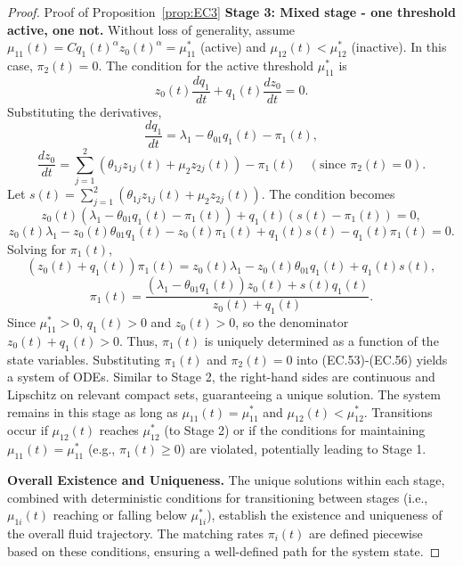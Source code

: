 \begin{proof}{Proof of Proposition~\ref{prop:EC3}}
\textbf{Stage 3: Mixed stage - one threshold active, one not.}
Without loss of generality, assume $\mu_{11}(t) = C q_1(t)^{\alpha} z_0(t)^{\alpha} = \mu_{11}^*$ (active) and $\mu_{12}(t) < \mu_{12}^*$ (inactive).
In this case, $\pi_2(t) = 0$. The condition for the active threshold $\mu_{11}^*$ is
\begin{equation*}
  z_0(t)\frac{dq_1}{dt} + q_1(t)\frac{dz_0}{dt} = 0.
\end{equation*}
Substituting the derivatives,
\begin{equation*}
  \frac{dq_1}{dt} = \lambda_1 - \theta_{01}q_1(t) - \pi_1(t),
\end{equation*}
\begin{equation*}
  \frac{dz_0}{dt} = \sum_{j=1}^{2}(\theta_{1j}z_{1j}(t) + \mu_2z_{2j}(t)) - \pi_1(t) \quad (\text{since } \pi_2(t)=0).
\end{equation*}
Let $s(t) = \sum_{j=1}^{2}(\theta_{1j}z_{1j}(t) + \mu_2z_{2j}(t))$.
The condition becomes
\begin{equation*}
  z_0(t)(\lambda_1 - \theta_{01}q_1(t) - \pi_1(t)) + q_1(t)(s(t) - \pi_1(t)) = 0,
\end{equation*}
\begin{equation*}
  z_0(t)\lambda_1 - z_0(t)\theta_{01}q_1(t) - z_0(t)\pi_1(t) + q_1(t)s(t) - q_1(t)\pi_1(t) = 0.
\end{equation*}
Solving for $\pi_1(t)$,
\begin{equation*}
  (z_0(t) + q_1(t))\pi_1(t) = z_0(t)\lambda_1 - z_0(t)\theta_{01}q_1(t) + q_1(t)s(t),
\end{equation*}
\begin{equation*}
  \pi_1(t) = \frac{(\lambda_1 - \theta_{01}q_1(t))z_0(t) + s(t)q_1(t)}{z_0(t) + q_1(t)}.
\end{equation*}
Since $\mu_{11}^* > 0$, $q_1(t) > 0$ and $z_0(t) > 0$, so the denominator $z_0(t) + q_1(t) > 0$.
Thus, $\pi_1(t)$ is uniquely determined as a function of the state variables.
Substituting $\pi_1(t)$ and $\pi_2(t)=0$ into (EC.53)-(EC.56) yields a system of ODEs.
Similar to Stage 2, the right-hand sides are continuous and Lipschitz on relevant compact sets, guaranteeing a unique solution.
The system remains in this stage as long as $\mu_{11}(t) = \mu_{11}^*$ and $\mu_{12}(t) < \mu_{12}^*$.
Transitions occur if $\mu_{12}(t)$ reaches $\mu_{12}^*$ (to Stage 2) or if the conditions for maintaining $\mu_{11}(t) = \mu_{11}^*$ (e.g., $\pi_1(t) \ge 0$) are violated, potentially leading to Stage 1.

\textbf{Overall Existence and Uniqueness.}
The unique solutions within each stage, combined with deterministic conditions for transitioning between stages (i.e., $\mu_{1i}(t)$ reaching or falling below $\mu_{1i}^*$), establish the existence and uniqueness of the overall fluid trajectory.
The matching rates $\pi_i(t)$ are defined piecewise based on these conditions, ensuring a well-defined path for the system state.
\Halmos
\end{proof}

